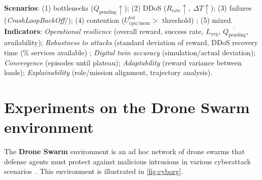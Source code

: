 \textbf{Scenarios}: (1) bottlenecks (\(Q_{\text{pending}}\uparrow\)); (2) DDoS (\(R_{\text{rate}}\uparrow,\ \Delta T\uparrow\)); (3) failures (\textit{CrashLoopBackOff}/); (4) contention (\(U_{\text{cpu/mem}}^{\text{tot}}>\) threshold) ; (5) mixed. \textbf{Indicators}: \emph{Operational resilience} (overall reward, success rate, \(L_{\text{avg}}\), \(\overline{Q_{\text{pending}}}\), availability); \emph{Robustness to attacks} (standard deviation of reward, DDoS recovery time (\% services available) ; \emph{Digital twin accuracy} (simulation/actual deviation); \emph{Convergence} (episodes until plateau); \emph{Adaptability} (reward variance between loads); \emph{Explainability} (role/mission alignment, trajectory analysis).


\section{Experiments on the Drone Swarm environment}

The \textbf{Drone Swarm} environment is an ad hoc network of drone swarms that defense agents must protect against malicious intrusions in various cyberattack scenarios~\cite{Standen2021}. This environment is illustrated in \autoref{fig:cyborg}.

